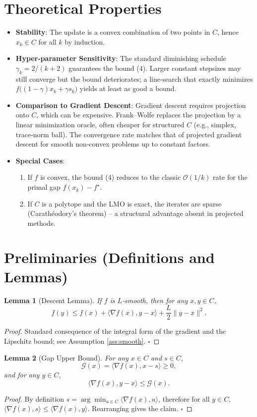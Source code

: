 \documentclass{article}
\newtheorem{lemma}{Lemma}
\newcommand{\grad}{\nabla}
\newcommand{\inner}[2]{\langle #1,#2\rangle}
\newcommand{\gap}{\mathcal{G}}
\begin{document}
\section*{Theoretical Properties}
\begin{itemize}[leftmargin=*]
\item \textbf{Stability}: The update is a convex combination of two points in $C$, hence $x_{k}\in C$ for all $k$ by induction.
\item \textbf{Hyper‑parameter Sensitivity}: The standard diminishing schedule $\gamma_k=2/(k+2)$ guarantees the bound (4). Larger constant stepsizes may still converge but the bound deteriorates; a line‑search that exactly minimizes $f\big((1-\gamma)x_k+\gamma s_k\big)$ yields at least as good a bound.
\item \textbf{Comparison to Gradient Descent}: Gradient descent requires projection onto $C$, which can be expensive. Frank–Wolfe replaces the projection by a linear minimization oracle, often cheaper for structured $C$ (e.g., simplex, trace‑norm ball). The convergence rate matches that of projected gradient descent for smooth non‑convex problems up to constant factors.
\item \textbf{Special Cases}:
    \begin{enumerate}
        \item If $f$ is convex, the bound (4) reduces to the classic $\mathcal O(1/k)$ rate for the primal gap $f(x_k)-f^\star$.
        \item If $C$ is a polytope and the LMO is exact, the iterates are sparse (Carathéodory’s theorem) – a structural advantage absent in projected methods.
    \end{enumerate}
\end{itemize}

\section*{Preliminaries (Definitions and Lemmas)}
\begin{lemma}[Descent Lemma]\label{lem:descent}
If $f$ is $L$‑smooth, then for any $x,y\in C$,
\[
f(y)\le f(x)+\inner{\grad f(x)}{y-x}+ \frac{L}{2}\|y-x\|^{2}. 
\]
\end{lemma}
\begin{proof}
Standard consequence of the integral form of the gradient and the Lipschitz bound; see Assumption \ref{ass:smooth}. \hfill $\square$
\end{proof}
\begin{lemma}[Gap Upper Bound]\label{lem:gap}
For any $x\in C$ and $s\in C$,
\[
\gap(x)=\inner{\grad f(x)}{x-s}\ge 0,
\]
and for any $y\in C$,
\[
\inner{\grad f(x)}{y-x}\le \gap(x). 
\]
\end{lemma}
\begin{proof}
By definition $s=\arg\min_{u\in C}\inner{\grad f(x)}{u}$, therefore for all $y\in C$,
$\inner{\grad f(x)}{s}\le\inner{\grad f(x)}{y}$.
Rearranging gives the claim. \hfill $\square$
\end{proof}
\end{document}

